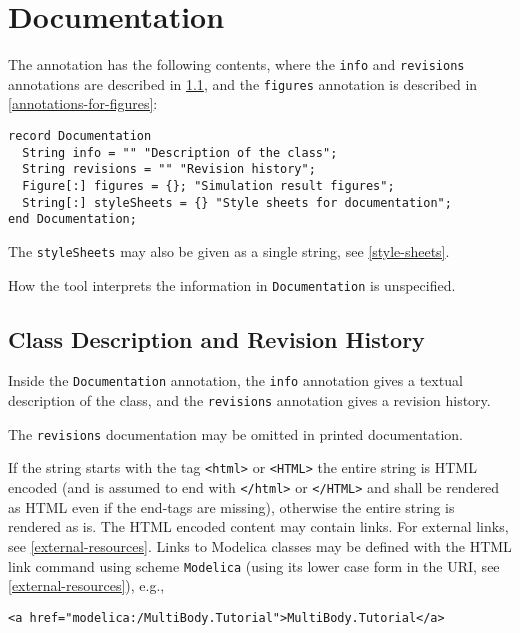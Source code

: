 \section{Documentation}\label{annotations-for-documentation}\label{documentation}

The  annotation has the following contents, where the \lstinline!info! and \lstinline!revisions! annotations are described in \cref{annotation-info-revisions}, and the \lstinline!figures! annotation is described in \cref{annotations-for-figures}:
\begin{lstlisting}[language=modelica]
record Documentation
  String info = "" "Description of the class";
  String revisions = "" "Revision history";
  Figure[:] figures = {}; "Simulation result figures";
  String[:] styleSheets = {} "Style sheets for documentation";
end Documentation;
\end{lstlisting}

The \lstinline!styleSheets! may also be given as a single string, see \cref{style-sheets}.

How the tool interprets the information in \lstinline!Documentation! is unspecified.

\subsection{Class Description and Revision History}\label{annotation-info-revisions}

Inside the \lstinline!Documentation! annotation, the \lstinline!info! annotation gives a textual description of the class, and the \lstinline!revisions! annotation gives a revision history.

\begin{nonnormative}
The \lstinline!revisions! documentation may be omitted in printed documentation.
\end{nonnormative}

If the string starts with the tag \lstinline!<html>! or \lstinline!<HTML>! the entire string is HTML encoded (and is assumed to end with \lstinline!</html>! or \lstinline!</HTML>! and shall be rendered as HTML even if the end-tags are missing), otherwise the entire string is rendered as is.
The HTML encoded content may contain links.
For external links, see \cref{external-resources}.
Links to Modelica classes may be defined with the HTML link command using scheme \lstinline!Modelica! (using its lower case form in the URI, see \cref{external-resources}), e.g.,
\begin{lstlisting}[language=modelica]
<a href="modelica:/MultiBody.Tutorial">MultiBody.Tutorial</a>
\end{lstlisting}

